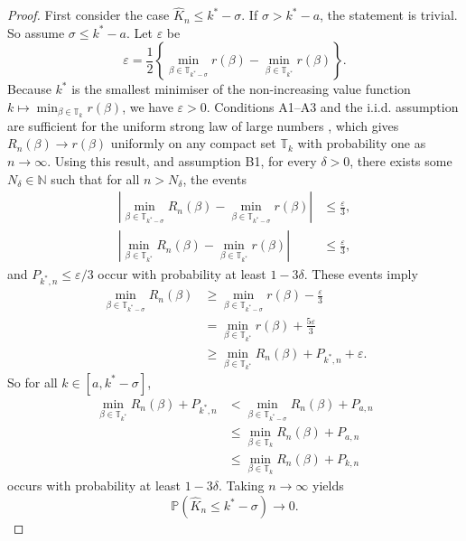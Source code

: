 \documentclass[12pt]{article}
\theoremstyle{remark}
\theoremstyle{plain}
\begin{document}
\begin{proof}
First consider the case $\hat{K}_{n}\le k^{*}-\sigma$. If $\sigma>k^{*}-a$,
the statement is trivial. So assume $\sigma\le k^{*}-a$. Let $\varepsilon$
be
\[
\varepsilon=\frac{1}{2}\left\{ \min_{\beta\in\mathbb{T}_{k^{*}-\sigma}}r(\beta)-\min_{\beta\in\mathbb{T}_{k^{*}}}r(\beta)\right\} .
\]
Because $k^*$ is the smallest minimiser of the non-increasing value function $k\mapsto \min_{\beta\in\mathbb{T}_k} r(\beta)$, we have $\varepsilon>0$.
Conditions A1--A3 and the i.i.d. assumption are sufficient for the
uniform strong law of large numbers \citet[Thm. 9.60]{shapiro_lectures_2021},
which gives $R_{n}(\beta)\to r(\beta)$ uniformly on any compact set
$\mathbb{T}_{k}$ with probability one as $n\to\infty$. Using this
result, and assumption B1, for every $\delta>0$, there exists some
$N_{\delta}\in\mathbb{N}$ such that for all $n>N_{\delta}$, the
events
\begin{align*}
\left|\min_{\beta\in\mathbb{T}_{k^{*}-\sigma}}R_{n}(\beta)-\min_{\beta\in\mathbb{T}_{k^{*}-\sigma}}r(\beta)\right| & \le\frac{\varepsilon}{3},\\
\left|\min_{\beta\in\mathbb{T}_{k^{*}}}R_{n}(\beta)-\min_{\beta\in\mathbb{T}_{k^{*}}}r(\beta)\right| & \le\frac{\varepsilon}{3},
\end{align*}
and $P_{k^{*},n}\le\varepsilon/3$ occur with probability at least
$1-3\delta$. These events imply
\begin{align*}
\min_{\beta\in\mathbb{T}_{k^{*}-\sigma}}R_{n}(\beta) & \ge\min_{\beta\in\mathbb{T}_{k^{*}-\sigma}}r(\beta)-\frac{\varepsilon}{3}\\
 & =\min_{\beta\in\mathbb{T}_{k^{*}}}r(\beta)+\frac{5\varepsilon}{3}\\
 & \ge\min_{\beta\in\mathbb{T}_{k^{*}}}R_{n}(\beta)+P_{k^{*},n}+\varepsilon.
\end{align*}
So for all $k\in\left[a,k^{*}-\sigma\right]$,
\begin{align*}
\min_{\beta\in\mathbb{T}_{k^{*}}}R_{n}(\beta)+P_{k^{*},n} & <\min_{\beta\in\mathbb{T}_{k^{*}-\sigma}}R_{n}(\beta)+P_{a,n}\\
 & \le\min_{\beta\in\mathbb{T}_{k}}R_{n}(\beta)+P_{a,n}\\
 & \le\min_{\beta\in\mathbb{T}_{k}}R_{n}(\beta)+P_{k,n}
\end{align*}
occurs with probability at least $1-3\delta$. Taking $n\to\infty$
yields
\[
\mathbb{P}\left(\hat{K}_{n}\le k^{*}-\sigma\right)\to0.
\]


\end{proof}
\end{document}
